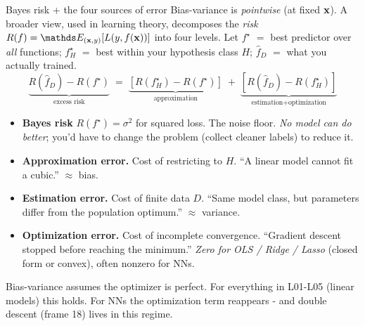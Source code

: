 \documentclass[aspectratio=169]{beamer}
\newcommand{\fD}{\hat{f}_D}
\begin{document}
\begin{frame}{Bayes risk + the four sources of error}
  Bias-variance is \emph{pointwise} (at fixed $\mathbf{x}$). A broader view, used in learning theory, decomposes the \emph{risk} $R(f) = \E_{(\xv,y)}[L(y, f(\xv))]$ into four levels.
  \vfill
  Let $f^\star$ $=$ best predictor over \emph{all} functions; $f_H^\star$ $=$ best within your hypothesis class $H$; $\fD$ $=$ what you actually trained.
  \[
    \underbrace{R(\fD) - R(f^\star)}_{\text{excess risk}}
    \;=\;
    \underbrace{[R(f_H^\star) - R(f^\star)]}_{\text{approximation}}
    \;+\;
    \underbrace{[R(\fD) - R(f_H^\star)]}_{\text{estimation} + \text{optimization}}
  \]
  \vfill
  \footnotesize
  \begin{itemize}\footnotesize
    \item \textbf{Bayes risk} $R(f^\star) = \sigma^2$ for squared loss. The noise floor. \emph{No model can do better}; you'd have to change the problem (collect cleaner labels) to reduce it.
    \item \textbf{Approximation error.} Cost of restricting to $H$. ``A linear model cannot fit a cubic.'' $\approx$ bias.
    \item \textbf{Estimation error.} Cost of finite data $D$. ``Same model class, but parameters differ from the population optimum.'' $\approx$ variance.
    \item \textbf{Optimization error.} Cost of incomplete convergence. ``Gradient descent stopped before reaching the minimum.'' \emph{Zero for OLS / Ridge / Lasso} (closed form or convex), often nonzero for NNs.
  \end{itemize}
  \vfill
  Bias-variance assumes the optimizer is perfect. For everything in L01-L05 (linear models) this holds. For NNs the optimization term reappears - and double descent (frame 18) lives in this regime.
\end{frame}
\end{document}
